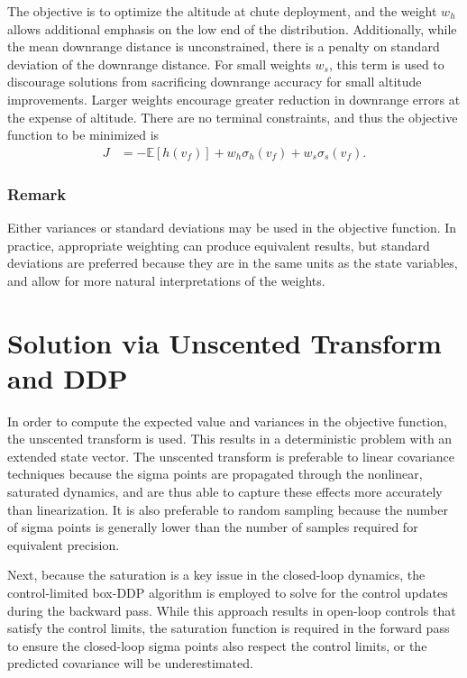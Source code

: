 \documentclass[letterpaper, paper,11pt]{AAS}
\newcommand{\E}[1]{\mathbb{E}\left[#1\right]}
\newcommand{\V}[1]{\mathbb{V}[#1]}
\begin{document}
The objective is to optimize the altitude at chute deployment, and the weight $w_h$ allows additional emphasis on the low end of the distribution. Additionally, while the mean downrange distance is unconstrained, there is a penalty on standard deviation of the downrange distance. For small weights $w_s$, this term is used to discourage solutions from sacrificing downrange accuracy for small altitude improvements. Larger weights encourage greater reduction in downrange errors at the expense of altitude.  There are no terminal constraints, and thus the objective function to be minimized is
\begin{align}
J &= -\E{h(v_f)} + w_h\sigma_h(v_f) + w_s\sigma_s(v_f).
\end{align}
\subsubsection{Remark} Either variances or standard deviations may be used in the objective function. In practice, appropriate weighting can produce equivalent results, but standard deviations are preferred because they are in the same units as the state variables, and allow for more natural interpretations of the weights.

\section{Solution via Unscented Transform and DDP}
In order to compute the expected value and variances in the objective function, the unscented transform \cite{UT1997} is used. This results in a deterministic problem with an extended state vector. The unscented transform is preferable to linear covariance techniques because the sigma points are propagated through the nonlinear, saturated dynamics, and are thus able to capture these effects more accurately than linearization. It is also preferable to random sampling because the number of sigma points is generally lower than the number of samples required for equivalent precision.

Next, because the saturation is a key issue in the closed-loop dynamics, the control-limited box-DDP algorithm \cite{DDP_ControlLimited} is employed to solve for the control updates during the backward pass. While this approach results in open-loop controls that satisfy the control limits, the saturation function is required in the forward pass to ensure the closed-loop sigma points also respect the control limits, or the predicted covariance will be underestimated.
\end{document}
